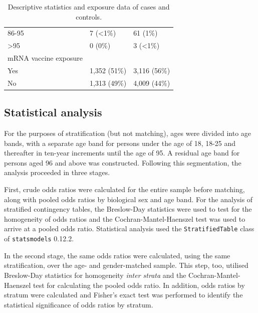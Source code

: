 \documentclass{article}
\begin{document}
\begin{table}[]
\begin{tabular}{@{}lll@{}}
\rowcolor[HTML]{EFEFEF}
\hspace{5mm}86-95                 & 7 (\textless{}1\%) & 61 (1\%)           \\
\rowcolor[HTML]{C0C0C0}
\hspace{5mm}\textgreater{}95      & 0 (0\%)            & 3 (\textless{}1\%) \\ \midrule
mRNA vaccine exposure &                    &                    \\
\rowcolor[HTML]{EFEFEF}
\hspace{5mm}Yes                   & 1,352 (51\%)       & 3,116 (56\%)       \\
\rowcolor[HTML]{C0C0C0}
\hspace{5mm}No                    & 1,313 (49\%)       & 4,009 (44\%)
\end{tabular}%
\caption{Descriptive statistics and exposure data of cases and controls.}
\label{tab:case-control-characteristics}
\end{table}

\subsection{Statistical analysis}

For the purposes of stratification (but not matching), ages were divided into age bands, with a separate age band for persons under the age of 18, 18-25 and thereafter in ten-year increments until the age of 95.
A residual age band for persons aged 96 and above was constructed. Following this segmentation, the analysis proceeded in three stages.

First, crude odds ratios were calculated for the entire sample before matching, along with pooled odds ratios by biological sex and age band.
For the analysis of stratified contingency tables, the Breslow-Day statistics were used to test for the homogeneity of odds ratios and the Cochran-Mantel-Haenszel test was used to arrive at a pooled odds ratio.
Statistical analysis used the \texttt{StratifiedTable} class of \texttt{statsmodels} 0.12.2.\cite{seabold2010statsmodels}

In the second stage, the same odds ratios were calculated, using the same stratification, over the age- and gender-matched sample.
This step, too, utilised Breslow-Day statistics for homogeneity \textit{inter strata} and the Cochran-Mantel-Haenszel test for calculating the pooled odds ratio.
In addition, odds ratios by stratum were calculated and Fisher's exact test was performed to identify the statistical significance of odds ratios by stratum.
\end{document}
